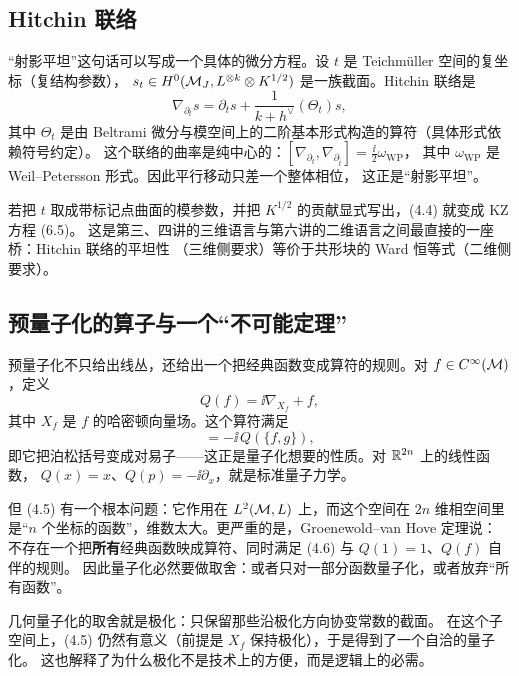 \subsection{Hitchin 联络}

“射影平坦”这句话可以写成一个具体的微分方程。设 $t$ 是 Teichmüller 空间的复坐标（复结构参数），
$s_t\in H^0(\mathcal{M}_J,L^{\otimes k}\otimes K^{1/2})$ 是一族截面。Hitchin 联络是
\begin{equation}
\nabla_{\partial_t}s=\partial_t s+\frac{1}{k+h^\vee}\left(\Theta_t\right)s, \tag{4.4}
\end{equation}
其中 $\Theta_t$ 是由 Beltrami 微分与模空间上的二阶基本形式构造的算符（具体形式依赖符号约定）。
这个联络的曲率是纯中心的：$[\nabla_{\partial_t},\nabla_{\partial_{\bar t}}]=\frac{\ii}{2}\omega_{\mathrm{WP}}$，
其中 $\omega_{\mathrm{WP}}$ 是 Weil--Petersson 形式。因此平行移动只差一个整体相位，
这正是“射影平坦”。

若把 $t$ 取成带标记点曲面的模参数，并把 $K^{1/2}$ 的贡献显式写出，(4.4) 就变成 KZ 方程 (6.5)。
这是第三、四讲的三维语言与第六讲的二维语言之间最直接的一座桥：Hitchin 联络的平坦性
（三维侧要求）等价于共形块的 Ward 恒等式（二维侧要求）。

\subsection{预量子化的算子与一个“不可能定理”}

预量子化不只给出线丛，还给出一个把经典函数变成算符的规则。对 $f\in C^\infty(\mathcal{M})$，定义
\begin{equation}
Q(f)=\ii\nabla_{X_f}+f, \tag{4.5}
\end{equation}
其中 $X_f$ 是 $f$ 的哈密顿向量场。这个算符满足
\begin{equation}
[Q(f),Q(g)]=-\ii\,Q(\{f,g\}), \tag{4.6}
\end{equation}
即它把泊松括号变成对易子——这正是量子化想要的性质。对 $\mathbb{R}^{2n}$ 上的线性函数，
$Q(x)=x$、$Q(p)=-\ii\partial_x$，就是标准量子力学。

但 (4.5) 有一个根本问题：它作用在 $L^2(\mathcal{M},L)$ 上，而这个空间在 $2n$ 维相空间里
是“$n$ 个坐标的函数”，维数太大。更严重的是，Groenewold–van Hove 定理说：
不存在一个把\textbf{所有}经典函数映成算符、同时满足 (4.6) 与 $Q(1)=1$、$Q(f)$ 自伴的规则。
因此量子化必然要做取舍：或者只对一部分函数量子化，或者放弃“所有函数”。

几何量子化的取舍就是极化：只保留那些沿极化方向协变常数的截面。
在这个子空间上，(4.5) 仍然有意义（前提是 $X_f$ 保持极化），于是得到了一个自洽的量子化。
这也解释了为什么极化不是技术上的方便，而是逻辑上的必需。

